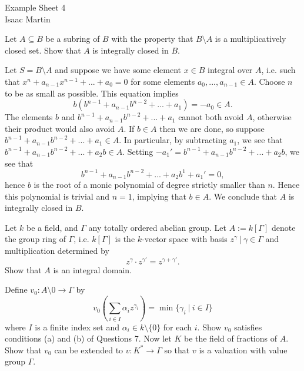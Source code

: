 


\pagestyle{empty}
	\LARGE
\begin{center}
	Example Sheet 4\\
	\Large
	Isaac Martin \\
\end{center}
\normalsize
\vspace{-2mm}
\hru

\begin{homework}[e]
     Let $A\subseteq B$ be a subring of $B$ with the property that $B \setminus A$ is a multiplicatively closed set. Show that $A$ is integrally closed in $B$.

	\begin{prf}
		Let $S = B \setminus A$ and suppose we have some element $x \in B$ integral over $A$, i.e. such that $x^{n} + a_{n-1}x^{n-1} + ... + a_0 = 0$ for some elements $a_0, ..., a_{n-1} \in A$. Choose $n$ to be as small as possible. This equation implies
		\[
		b\left(b^{n-1}+a_{n-1}b^{n-2}+...+a_1\right) = -a_0 \in A.
		\]
		The elements $b$ and $b^{n-1} + a_{n-1}b^{n-2}+...+a_1$ cannot both avoid $A$, otherwise their product would also avoid $A$. If $b \in A$ then we are done, so suppose $b^{n-1} + a_{n-1}b^{n-2}+...+a_1 \in A$. In particular, by subtracting $a_1$, we see that $b^{n-1} + a_{n-1}b^{n-2}+...+a_2b \in A$. Setting $-a_1' = b^{n-1} + a_{n-1}b^{n-2}+...+a_2b$, we see that
		\[
		b^{n-1} + a_{n-1}b^{n-2} +...+a_2b^1 + a_1' = 0,
		\]
		hence $b$ is the root of a monic polynomial of degree strictly smaller than $n$. Hence this polynomial is trivial and $n=1$, implying that $b \in A$. We conclude that $A$ is integrally closed in $B$.
	\end{prf}

	 Let $k$ be a field, and $\Gamma$ any totally ordered abelian group. Let $A := k[\Gamma]$ denote the group ring of $\Gamma$, i.e. $k[\Gamma]$ is the $k$-vector space with basis ${z^\gamma ~|~ \gamma \in \Gamma}$ and multiplication determined by
	\[
	z^{\gamma}\cdot z^{\gamma'} = z^{\gamma + \gamma'}.
	\]
	Show that $A$ is an integral domain.

	Define $v_0:A\setminus {0}\to \Gamma$ by 
	\[
	v_0\left(\sum_{i\in I} \alpha_iz^{\gamma_i}\right) = \min \{\gamma_i ~|~ i\in I\}
	\]
	where $I$ is a finite index set and $\alpha_i \in k\setminus \{0\}$ for each $i$. Show $v_0$ satisfies conditions (a) and (b) of Questions 7. Now let $K$ be the field of fractions of $A$. Show that $v_0$ can be extended to $v:K^*\to \Gamma$ so that $v$ is a valuation with value group $\Gamma$.
\end{homework}

